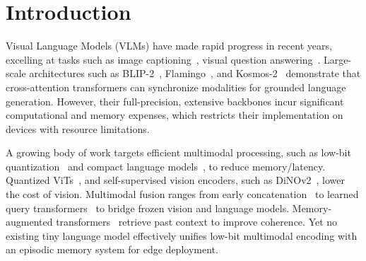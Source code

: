 \section{Introduction}
\label{sec:intro}
Visual Language Models (VLMs) have made rapid progress in recent years, excelling at tasks such as image captioning~\citep{chen-microsoftcoco-2015}, visual question answering~\citep{anderson-attentionimagecap-2018, lijunan-blip-2022}. %
Large-scale architectures such as BLIP-2~\citep{lijunnan-blip2-2023}, Flamingo~\citep{alayrac-flamingo-2022}, and Kosmos-2~\citep{peng-kosmos2-2023} demonstrate that cross-attention transformers can synchronize modalities for grounded language generation. However, their full-precision, extensive backbones incur significant computational and memory expenses, which restricts their implementation on devices with resource limitations.

A growing body of work targets efficient multimodal processing, such as low-bit quantization~\citep{dettmers-8bitquantization-2021, frantar-gptq-2022} and compact language models~\citep{wang-bitnet-2023}, to reduce memory/latency. Quantized ViTs~\citep{jacob-quantization-2018, stock-revisiting-2019}, and self-supervised vision encoders, such as DiNOv2~\citep{oquab-dinov2-2024}, lower the cost of vision. Multimodal fusion ranges from early concatenation~\citep{lu-vilbert-2019} to learned query transformers~\citep{lijunnan-blip2-2023} to bridge frozen vision and language models. Memory-augmented transformers~\citep{graves-dynamicexternalmemory-2016, borgeaud-trillionstokens-2022} retrieve past context to improve coherence. 
Yet no existing tiny language model effectively unifies low-bit multimodal encoding with an episodic memory system for edge deployment.



